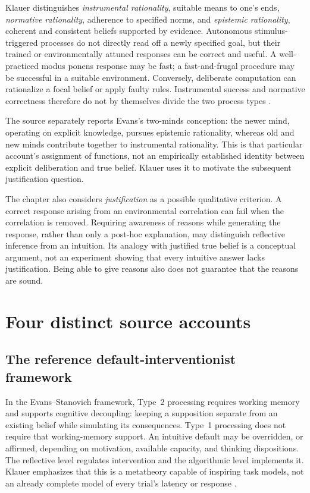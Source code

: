 Klauer distinguishes \emph{instrumental rationality}, suitable means to
one's ends, \emph{normative rationality}, adherence to specified norms,
and \emph{epistemic rationality}, coherent and consistent beliefs supported
by evidence. Autonomous stimulus-triggered processes do not directly
read off a newly specified goal, but their trained or environmentally
attuned responses can be correct and useful. A well-practiced modus
ponens response may be fast; a fast-and-frugal procedure may be successful
in a suitable environment. Conversely, deliberate computation can
rationalize a focal belief or apply faulty rules. Instrumental success
and normative correctness therefore do not by themselves divide the
two process types \cite[pp.~174--176]{Klauer2021DualProcess}.

The source separately reports Evans's two-minds conception: the newer
mind, operating on explicit knowledge, pursues epistemic rationality,
whereas old and new minds contribute together to instrumental rationality.
This is that particular account's assignment of functions, not an
empirically established identity between explicit deliberation and true
belief. Klauer uses it to motivate the subsequent justification question.

The chapter also considers \emph{justification} as a possible qualitative
criterion. A correct response arising from an environmental correlation
can fail when the correlation is removed. Requiring awareness of reasons
while generating the response, rather than only a post-hoc explanation,
may distinguish reflective inference from an intuition. Its analogy
with justified true belief is a conceptual argument, not an experiment
showing that every intuitive answer lacks justification. Being able to
give reasons also does not guarantee that the reasons are sound.

\section{Four distinct source accounts}

\subsection{The reference default-interventionist framework}

In the Evans--Stanovich framework, Type~2 processing requires working
memory and supports cognitive decoupling: keeping a supposition separate
from an existing belief while simulating its consequences. Type~1
processing does not require that working-memory support. An intuitive
default may be overridden, or affirmed, depending on motivation,
available capacity, and thinking dispositions. The reflective level
regulates intervention and the algorithmic level implements it. Klauer
emphasizes that this is a metatheory capable of inspiring task models,
not an already complete model of every trial's latency or response
\cite[p.~176]{Klauer2021DualProcess}.

